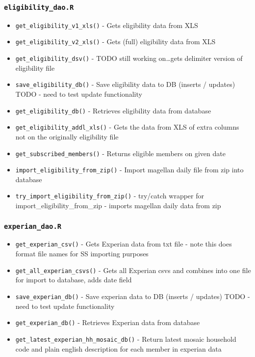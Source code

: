 \documentclass[
]{book}
\providecommand{\tightlist}{%
  \setlength{\itemsep}{0pt}\setlength{\parskip}{0pt}}
\begin{document}
\hypertarget{eligibility_dao.r}{%
\subsubsection{\texorpdfstring{\texttt{eligibility\_dao.R}}{eligibility\_dao.R}}\label{eligibility_dao.r}}

\begin{itemize}
\tightlist
\item
  \texttt{get\_eligibility\_v1\_xls()} - Gets eligibility data from XLS
\item
  \texttt{get\_eligibility\_v2\_xls()} - Gets (full) eligibility data from XLS
\item
  \texttt{get\_eligibility\_dsv()} - TODO still working on\ldots gets delimiter version of eligibility file
\item
  \texttt{save\_eligibility\_db()} - Save eligibility data to DB (inserts / updates) TODO - need to test update functionality
\item
  \texttt{get\_eligibility\_db()} - Retrieves eligibility data from database
\item
  \texttt{get\_eligibility\_addl\_xls()} - Gets the data from XLS of extra columns not on the originally eligibility file
\item
  \texttt{get\_subscribed\_members()} - Returns eligible members on given date
\item
  \texttt{import\_eligibility\_from\_zip()} - Import magellan daily file from zip into database
\item
  \texttt{try\_import\_eligibility\_from\_zip()} - try/catch wrapper for import\_eligibility\_from\_zip - imports magellan daily data from zip
\end{itemize}

\hypertarget{experian_dao.r}{%
\subsubsection{\texorpdfstring{\texttt{experian\_dao.R}}{experian\_dao.R}}\label{experian_dao.r}}

\begin{itemize}
\tightlist
\item
  \texttt{get\_experian\_csv()} - Gets Experian data from txt file - note this does format file names for SS importing purposes
\item
  \texttt{get\_all\_experian\_csvs()} - Gets all Experian csvs and combines into one file for import to database, adds date field
\item
  \texttt{save\_experian\_db()} - Save experian data to DB (inserts / updates) TODO - need to test update functionality
\item
  \texttt{get\_experian\_db()} - Retrieves Experian data from database
\item
  \texttt{get\_latest\_experian\_hh\_mosaic\_db()} - Return latest mosaic household code and plain english description for each member in experian data
\end{itemize}
\end{document}
